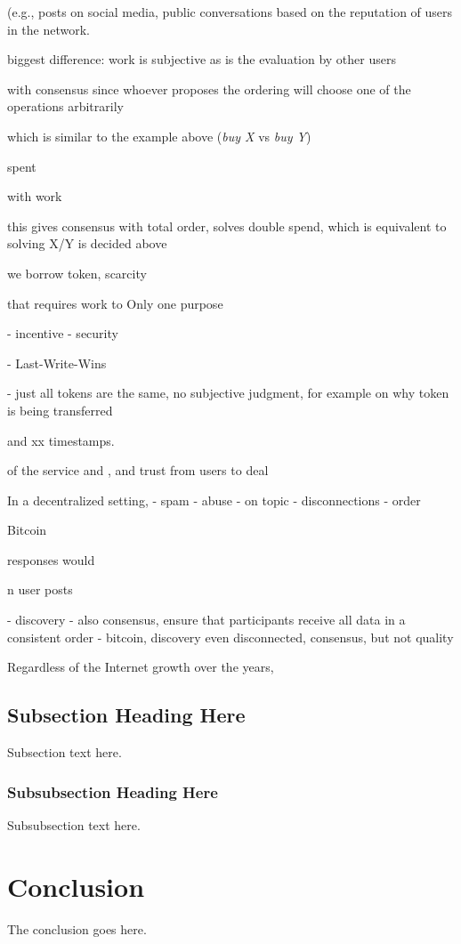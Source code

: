 \documentclass[10pt,journal,compsoc]{IEEEtran}
\begin{document}
 (e.g., posts on social media, public conversations
based on the reputation of users
in the network.


biggest difference:
work is subjective as is the evaluation by other users


 with consensus since
whoever proposes the ordering will choose one of the operations arbitrarily


 which is similar to the
example above (\emph{buy X} vs \emph{buy Y})

spent

with work



this gives consensus with total order, solves double spend, which is equivalent
to solving X/Y is decided above

we borrow token, scarcity


 that requires work to 
Only one purpose


- incentive
- security

- Last-Write-Wins

- just all tokens are the same, no subjective judgment, for example on why token is being transferred


 and xx timestamps.


 of the service and , and trust from users to deal

In a decentralized setting, 
    - spam
    - abuse
    - on topic
    - disconnections
    - order

Bitcoin

responses would




n user posts 

- discovery
- also consensus, ensure that participants receive all data in a consistent order
- bitcoin, discovery even disconnected, consensus, but not quality


Regardless of the Internet growth over the years,

\subsection{Subsection Heading Here}
Subsection text here.

\subsubsection{Subsubsection Heading Here}
Subsubsection text here.

\section{Conclusion}
The conclusion goes here.
\end{document}

